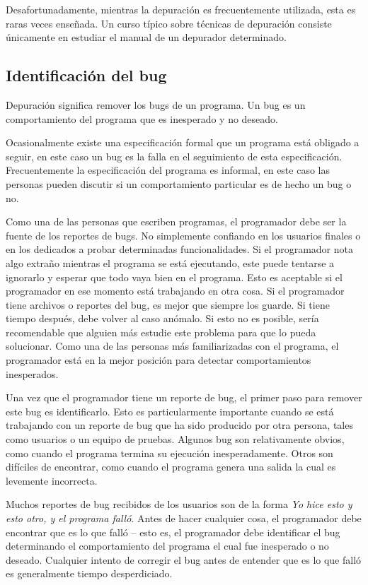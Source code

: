 \documentclass[12pt,legalpaper]{report}
\begin{document}
Desafortunadamente, mientras la depuración es frecuentemente utilizada, esta es raras veces enseñada. Un curso típico sobre técnicas de depuración consiste únicamente en estudiar el manual de un depurador determinado.

\subsection{Identificación del bug}

Depuración significa remover los bugs de un programa.  Un bug es un comportamiento del programa que es inesperado y no deseado.

Ocasionalmente existe una especificación formal que un programa está obligado a seguir, en este caso un bug es la falla en el seguimiento de esta especificación.  Frecuentemente la especificación del programa es informal, en este caso las personas pueden discutir si un comportamiento particular es de hecho un bug o no.

Como una de las personas que escriben programas, el programador debe ser la fuente de los reportes de bugs.  No simplemente confiando en los usuarios finales o en los dedicados a probar determinadas funcionalidades.  Si el programador nota algo extraño mientras el programa se está ejecutando, este puede tentarse a ignorarlo y esperar que todo vaya bien en el programa.  Esto es aceptable si el programador en ese momento está trabajando en otra cosa.  Si el programador tiene archivos o reportes del bug, es mejor que siempre los guarde.  Si tiene tiempo después, debe volver al caso anómalo.  Si esto no es posible, sería recomendable que alguien más estudie este problema para que lo pueda solucionar.  Como una de las personas más familiarizadas con el programa, el programador está en la mejor posición para detectar comportamientos inesperados.

Una vez que el programador tiene un reporte de bug, el primer paso para remover este bug es identificarlo.  Esto es particularmente importante cuando se está trabajando con un reporte de bug que ha sido producido por otra persona, tales como usuarios o un equipo de pruebas.  Algunos bug son relativamente obvios, como cuando el programa termina su ejecución inesperadamente. Otros son difíciles de encontrar, como cuando el programa genera una salida la cual es levemente incorrecta.

Muchos reportes de bug recibidos de los usuarios son de la forma \textit{Yo hice esto y esto otro, y el programa falló}.  Antes de hacer cualquier cosa, el programador debe encontrar que es lo que falló -- esto es, el programador debe identificar el bug determinando el comportamiento del programa el cual fue inesperado o no deseado.  Cualquier intento de corregir el bug antes de entender que es lo que falló es generalmente tiempo desperdiciado.
\end{document}

